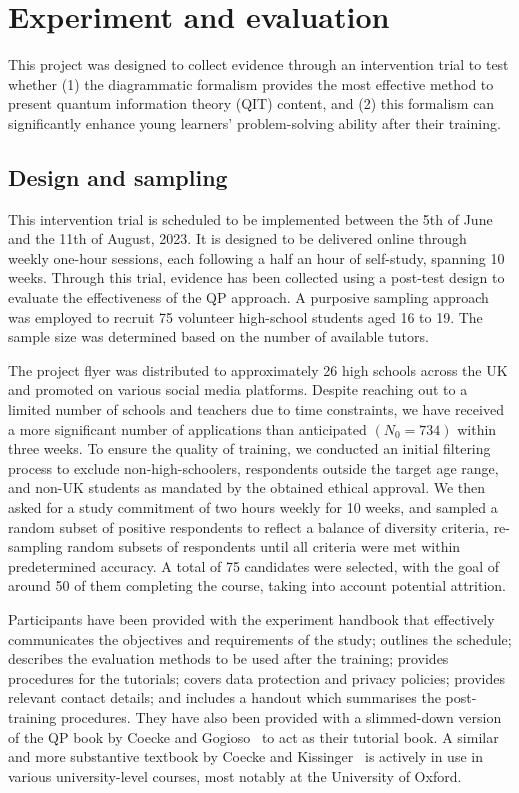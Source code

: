 \section{Experiment and evaluation}
\label{sec:xpmt}

This project was designed to collect evidence through an intervention trial to test whether (1) the diagrammatic formalism provides the most effective method to present quantum information theory (QIT) content, and (2) this formalism can significantly enhance young learners’ problem-solving ability after their training.


\subsection{Design and sampling}

This intervention trial is scheduled to be implemented between the 5th of June and the 11th of August, 2023.
It is designed to be delivered online through weekly one-hour sessions, each following a half an hour of self-study, spanning 10 weeks.
Through this trial, evidence has been 
 collected using a post-test design to evaluate the effectiveness of the QP approach.
A purposive sampling approach was employed to recruit 75 volunteer high-school students aged 16 to 19. The sample size was determined based on the number of available tutors. 

The project flyer was distributed to approximately 26 high schools across the UK and promoted on various social media platforms. Despite reaching out to a limited number of schools and teachers due to time constraints, we have received a more significant number of applications than anticipated $(N_0=734)$ within three weeks.
To ensure the quality of training, we  conducted an initial filtering process to exclude non-high-schoolers, respondents outside the target age range, and non-UK students as mandated by the obtained ethical approval.
We then asked for a study commitment of two hours weekly for 10 weeks, and sampled a random subset of positive respondents to reflect a balance of diversity criteria, re-sampling random subsets of respondents until all criteria were met within predetermined accuracy.
A total of 75 candidates were selected, with the goal of around 50 of them completing the course, taking into account potential attrition.

Participants have been provided with the experiment handbook that effectively communicates the objectives and requirements of the study; outlines the schedule; describes the evaluation methods to be used after the training; provides procedures for the tutorials; covers data protection and privacy policies; provides relevant contact details; and includes a handout which summarises the post-training procedures.
They have also been provided with a slimmed-down version of the QP book by Coecke and Gogioso~\cite{coecke2022quantum} to act as their tutorial book.
A similar and more substantive textbook by Coecke and Kissinger~\cite{CKbook} is actively  in use in various university-level courses, most notably at the University of Oxford.

